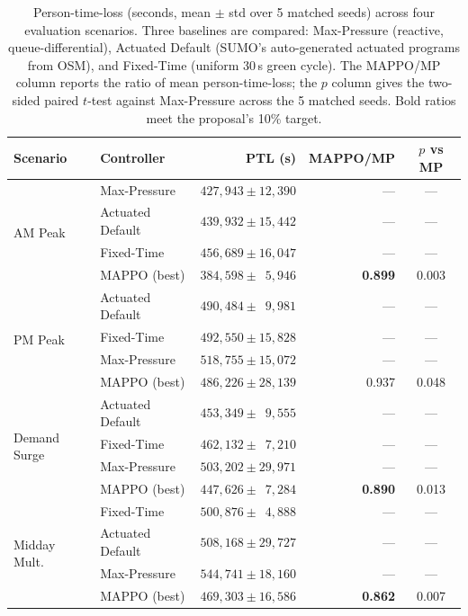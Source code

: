 \documentclass{article}
\begin{document}
\begin{table}[t]
  \centering
  \small
  \caption{Person-time-loss (seconds, mean $\pm$ std over 5 matched seeds) across four evaluation scenarios. Three baselines are compared: Max-Pressure (reactive, queue-differential), Actuated Default (SUMO's auto-generated actuated programs from OSM), and Fixed-Time (uniform 30\,s green cycle). The MAPPO/MP column reports the ratio of mean person-time-loss; the $p$ column gives the two-sided paired $t$-test against Max-Pressure across the 5 matched seeds. Bold ratios meet the proposal's 10\% target.}
  \label{tab:results}
  \begin{tabular}{@{}llrrc@{}}
    \toprule
    \textbf{Scenario} & \textbf{Controller} & \textbf{PTL (s)} & \textbf{MAPPO/MP} & \textbf{$p$ vs MP} \\
    \midrule
    \multirow{4}{*}{AM Peak}
      & Max-Pressure     & $427{,}943 \pm 12{,}390$ & --- & --- \\
      & Actuated Default & $439{,}932 \pm 15{,}442$ & --- & --- \\
      & Fixed-Time       & $456{,}689 \pm 16{,}047$ & --- & --- \\
      & MAPPO (best)     & $384{,}598 \pm \phantom{0}5{,}946$ & \textbf{0.899} & 0.003 \\
    \midrule
    \multirow{4}{*}{PM Peak}
      & Actuated Default & $490{,}484 \pm \phantom{0}9{,}981$ & --- & --- \\
      & Fixed-Time       & $492{,}550 \pm 15{,}828$ & --- & --- \\
      & Max-Pressure     & $518{,}755 \pm 15{,}072$ & --- & --- \\
      & MAPPO (best)     & $486{,}226 \pm 28{,}139$ & 0.937 & 0.048 \\
    \midrule
    \multirow{4}{*}{Demand Surge}
      & Actuated Default & $453{,}349 \pm \phantom{0}9{,}555$ & --- & --- \\
      & Fixed-Time       & $462{,}132 \pm \phantom{0}7{,}210$ & --- & --- \\
      & Max-Pressure     & $503{,}202 \pm 29{,}971$ & --- & --- \\
      & MAPPO (best)     & $447{,}626 \pm \phantom{0}7{,}284$ & \textbf{0.890} & 0.013 \\
    \midrule
    \multirow{4}{*}{Midday Mult.}
      & Fixed-Time       & $500{,}876 \pm \phantom{0}4{,}888$ & --- & --- \\
      & Actuated Default & $508{,}168 \pm 29{,}727$ & --- & --- \\
      & Max-Pressure     & $544{,}741 \pm 18{,}160$ & --- & --- \\
      & MAPPO (best)     & $469{,}303 \pm 16{,}586$ & \textbf{0.862} & 0.007 \\
    \bottomrule
  \end{tabular}
\end{table}
\end{document}
